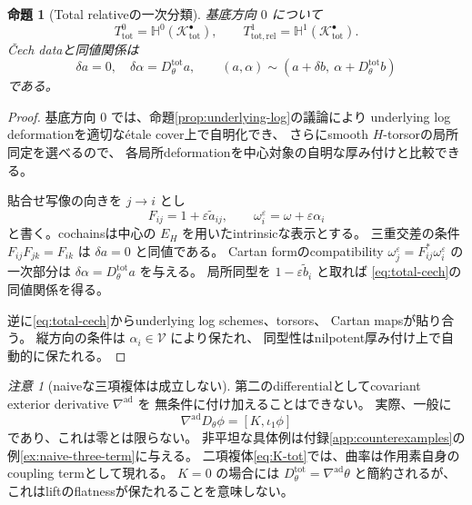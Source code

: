 \documentclass[uplatex,dvipdfmx,11pt]{jsarticle}
\numberwithin{equation}{section}
\theoremstyle{plain}
\newtheorem{proposition}[theorem]{命題}
\theoremstyle{definition}
\theoremstyle{remark}
\newtheorem{remark}[theorem]{注意}
\newcommand{\shV}{\mathcal V}
\newcommand{\Ktot}{\mathcal K_{\mathrm{tot}}^\bullet}
\newcommand{\Dtot}{D_\theta^{\mathrm{tot}}}
\newcommand{\nablaad}{\nabla^{\mathrm{ad}}}
\newcommand{\Hyp}{\mathbb H}
\begin{document}
\begin{proposition}[Total relativeの一次分類]
\label{prop:total-classification}
基底方向 \(0\) について
\begin{equation}
\label{eq:total-classification}
T^0_{\mathrm{tot}}=\Hyp^0(\Ktot),
\qquad
T^1_{\mathrm{tot,rel}}=\Hyp^1(\Ktot).
\end{equation}
Čech dataと同値関係は
\begin{equation}
\label{eq:total-cech}
\delta a=0,\quad \delta\alpha=\Dtot a,
\qquad
(a,\alpha)\sim(a+\delta b,\ \alpha+\Dtot b)
\end{equation}
である。
\end{proposition}

\begin{proof}
基底方向 \(0\) では、命題\ref{prop:underlying-log}の議論により
underlying log deformationを適切なétale cover上で自明化でき、
さらにsmooth \(H\)-torsorの局所同定を選べるので、
各局所deformationを中心対象の自明な厚み付けと比較できる。

貼合せ写像の向きを \(j\to i\) とし
\[
F_{ij}=1+\varepsilon\widetilde a_{ij},\qquad
\omega_i^\varepsilon=\omega+\varepsilon\alpha_i
\]
と書く。cochainsは中心の \(E_H\) を用いたintrinsicな表示とする。
三重交差の条件 \(F_{ij}F_{jk}=F_{ik}\) は \(\delta a=0\) と同値である。
Cartan formのcompatibility \(\omega_j^\varepsilon=F_{ij}^*\omega_i^\varepsilon\) の
一次部分は \(\delta\alpha=\Dtot a\) を与える。
局所同型を \(1-\varepsilon\widetilde b_i\) と取れば
\eqref{eq:total-cech}の同値関係を得る。

逆に\eqref{eq:total-cech}からunderlying log schemes、torsors、
Cartan mapsが貼り合う。
縦方向の条件は \(\alpha_i\in\shV\) により保たれ、
同型性はnilpotent厚み付け上で自動的に保たれる。
\end{proof}

\begin{remark}[naiveな三項複体は成立しない]
\label{rem:naive-three-term}
第二のdifferentialとしてcovariant exterior derivative \(\nablaad\) を
無条件に付け加えることはできない。
実際、一般に
\[
\nablaad D_\theta\phi=[K,\iota_1\phi]
\]
であり、これは零とは限らない。
非平坦な具体例は付録\ref{app:counterexamples}の例\ref{ex:naive-three-term}に与える。
二項複体\eqref{eq:K-tot}では、曲率は作用素自身のcoupling termとして現れる。
\(K=0\) の場合には \(\Dtot=\nablaad\theta\) と簡約されるが、
これはliftのflatnessが保たれることを意味しない。
\end{remark}

\end{document}
